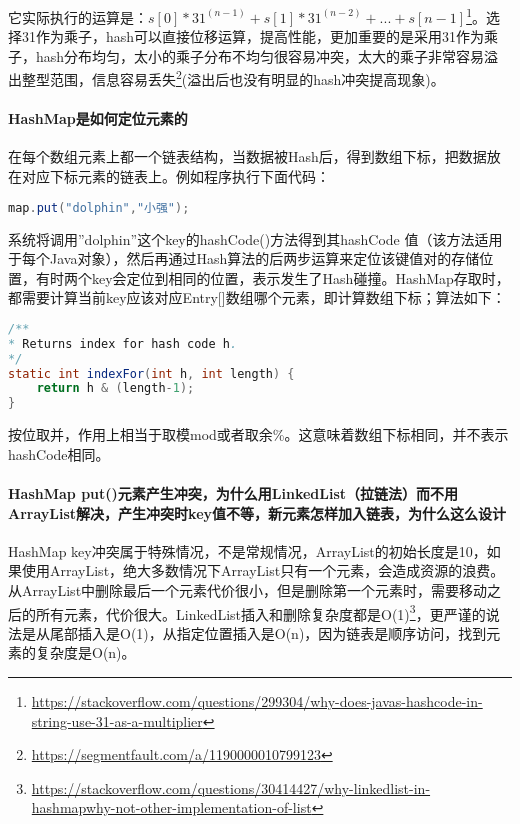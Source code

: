 \documentclass[../../../interview-questions.tex]{subfiles}
\begin{document}
它实际执行的运算是：$s[0]*31^{(n-1)} + s[1]*31^{(n-2)} + ... + s[n-1]$\footnote{\url{https://stackoverflow.com/questions/299304/why-does-javas-hashcode-in-string-use-31-as-a-multiplier}}。选择31作为乘子，hash可以直接位移运算，提高性能，更加重要的是采用31作为乘子，hash分布均匀，太小的乘子分布不均匀很容易冲突，太大的乘子非常容易溢出整型范围，信息容易丢失\footnote{\url{https://segmentfault.com/a/1190000010799123}}(溢出后也没有明显的hash冲突提高现象)。

\paragraph{HashMap是如何定位元素的}

在每个数组元素上都一个链表结构，当数据被Hash后，得到数组下标，把数据放在对应下标元素的链表上。例如程序执行下面代码：

\begin{lstlisting}[language=Java]
map.put("dolphin","小强");
\end{lstlisting}

系统将调用”dolphin”这个key的hashCode()方法得到其hashCode 值（该方法适用于每个Java对象），然后再通过Hash算法的后两步运算来定位该键值对的存储位置，有时两个key会定位到相同的位置，表示发生了Hash碰撞。HashMap存取时，都需要计算当前key应该对应Entry[]数组哪个元素，即计算数组下标；算法如下：

\begin{lstlisting}[language=Java]
/**
* Returns index for hash code h.
*/
static int indexFor(int h, int length) {
	return h & (length-1);
}
\end{lstlisting}

按位取并，作用上相当于取模mod或者取余\%。这意味着数组下标相同，并不表示hashCode相同。


\paragraph{HashMap put()元素产生冲突，为什么用LinkedList（拉链法）而不用ArrayList解决，产生冲突时key值不等，新元素怎样加入链表，为什么这么设计}

HashMap key冲突属于特殊情况，不是常规情况，ArrayList的初始长度是10，如果使用ArrayList，绝大多数情况下ArrayList只有一个元素，会造成资源的浪费。从ArrayList中删除最后一个元素代价很小，但是删除第一个元素时，需要移动之后的所有元素，代价很大。LinkedList插入和删除复杂度都是O(1)\footnote{\url{https://stackoverflow.com/questions/30414427/why-linkedlist-in-hashmapwhy-not-other-implementation-of-list}}，更严谨的说法是从尾部插入是O(1)，从指定位置插入是O(n)，因为链表是顺序访问，找到元素的复杂度是O(n)。
\end{document}
